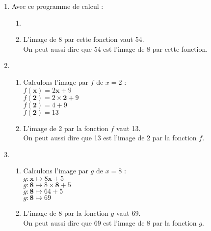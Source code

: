 \begin{corrige}
    \begin{enumerate}
        \item Avec ce programme de calcul :
        
        \begin{enumerate}
        \item 
        \setlength{\fboxrule}{0.5mm}
        \par\vspace{0.25cm}
        \noindent{}
        \par\vspace{0.25cm} 

        \item L'image de 8 par cette fonction vaut 54.\\
    On peut aussi dire que 54 est l'image de 8 par cette fonction.
    \end{enumerate}
    
        \item \begin{enumerate}
        \item Calculons l'image par $f$ de $x= 2$ :
    \\
    $f({\boldsymbol{x}})= 2 {\boldsymbol{x}}+9$
    \\
    $f({\boldsymbol{2}})= 2\times {\boldsymbol{2}}+9$
    \\
    $f({\boldsymbol{2}})= 4+9$
    \\
    $f({\boldsymbol{2}})= 13$
        \item L'image de 2 par la fonction $f$ vaut 13.
    \\
     On peut aussi dire que 13 est l'image de 2 par la fonction $f$.
    \end{enumerate}
    
        \item \begin{enumerate}
        \item Calculons l'image par $g$ de $x= 8$ :
    \\
    $g:{\boldsymbol{x}}\longmapsto 8 {\boldsymbol{x}}+5$
    \\
    $g:{\boldsymbol{8}}\longmapsto 8\times {\boldsymbol{8}}+5$
    \\
    $g:{\boldsymbol{8}}\longmapsto 64+5$
    \\
    $g:{\boldsymbol{8}}\longmapsto 69$
        \item L'image de 8 par la fonction $g$ vaut 69.
    \\
     On peut aussi dire que 69 est l'image de 8 par la fonction $g$.
    \end{enumerate}
    

\end{enumerate}
\end{corrige}
